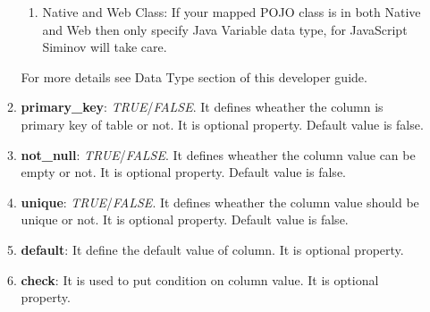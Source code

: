 \begin{enumerate}
\begin{enumerate}
\begin{center}
{{\begin{enumerate}
					\textbf{JavaScript Data Type's}
					\begin{enumerate}

						\item \small String								

						\item \small Number								

						\item \small Boolean								

						\item \small Array								

						\item \small Object								

						\item \small Null								

						\item \small Undefined								
	
					\end{enumerate}


					\item \small Native and Web Class: If your mapped POJO class is in both Native and Web then only specify Java Variable data type, for JavaScript Siminov will take care.


				\end{enumerate}

				\vspace*{0.0cm} %
			}
		}

	\end{center}

				

				\par
				For more details see Data Type section of this developer guide.
			
			\item \small \textbf{primary\_key}: \textit{TRUE}/\textit{FALSE}. It defines wheather the column is primary key of table or not. It is optional property. Default value is false.
			\item \small \textbf{not\_null}: \textit{TRUE}/\textit{FALSE}. It defines wheather the column value can be empty or not. It is optional property. Default value is false.
			\item \small \textbf{unique}: \textit{TRUE}/\textit{FALSE}. It defines wheather the column value should be unique or not. It is optional property. Default value is false.
			\item \small \textbf{default}: It define the default value of column. It is optional property.
			\item \small \textbf{check}: It is used to put condition on column value. It is optional property.


\end{enumerate}
\end{enumerate}
